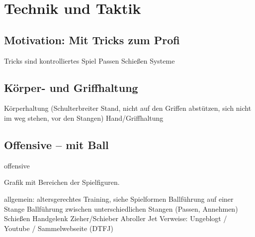 \chapter{Technik und Taktik}
\label{technik}

\section{Motivation: Mit Tricks zum Profi}
\label{technik:motivation}
Tricks sind kontrolliertes Spiel
Passen
Schießen
Systeme

\section{Körper- und Griffhaltung}
\label{technik:haltung}
Körperhaltung (Schulterbreiter Stand, nicht auf den Griffen abstützen, sich nicht im weg stehen, vor den Stangen)
Hand/Griffhaltung

\section{Offensive -- mit Ball}
\label{technik:offensive}


\gls{offensive}

Grafik mit Bereichen der Spielfiguren.

allgemein: altersgerechtes Training, siehe Spielformen
Ballführung auf einer Stange
Ballführung zwischen unterschiedlichen Stangen (Passen, Annehmen)
Schießen
Handgelenk
Zieher/Schieber
Abroller
Jet
Verweise: Ungeblogt / Youtube / Sammelwebseite (DTFJ)

